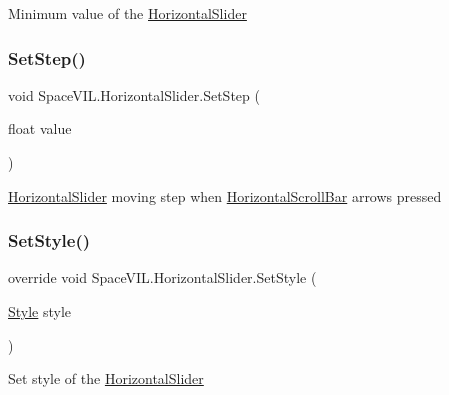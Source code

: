 Minimum value of the \mbox{\hyperlink{class_space_v_i_l_1_1_horizontal_slider}{Horizontal\+Slider}} 

\mbox{\label{class_space_v_i_l_1_1_horizontal_slider_a18ffac2f0c6f4f01725b4fd3778dc388}} 
\subsubsection{\texorpdfstring{Set\+Step()}{SetStep()}}
{\footnotesize\ttfamily void Space\+V\+I\+L.\+Horizontal\+Slider.\+Set\+Step (\begin{DoxyParamCaption}\item[{float}]{value }\end{DoxyParamCaption})}



\mbox{\hyperlink{class_space_v_i_l_1_1_horizontal_slider}{Horizontal\+Slider}} moving step when \mbox{\hyperlink{class_space_v_i_l_1_1_horizontal_scroll_bar}{Horizontal\+Scroll\+Bar}} arrows pressed 

\mbox{\label{class_space_v_i_l_1_1_horizontal_slider_aa8a43a400a6fcab217d8af348071bc5f}} 
\subsubsection{\texorpdfstring{Set\+Style()}{SetStyle()}}
{\footnotesize\ttfamily override void Space\+V\+I\+L.\+Horizontal\+Slider.\+Set\+Style (\begin{DoxyParamCaption}\item[{\mbox{\hyperlink{class_space_v_i_l_1_1_decorations_1_1_style}{Style}}}]{style }\end{DoxyParamCaption})\hspace{0.3cm}{\ttfamily [virtual]}}



Set style of the \mbox{\hyperlink{class_space_v_i_l_1_1_horizontal_slider}{Horizontal\+Slider}} 



